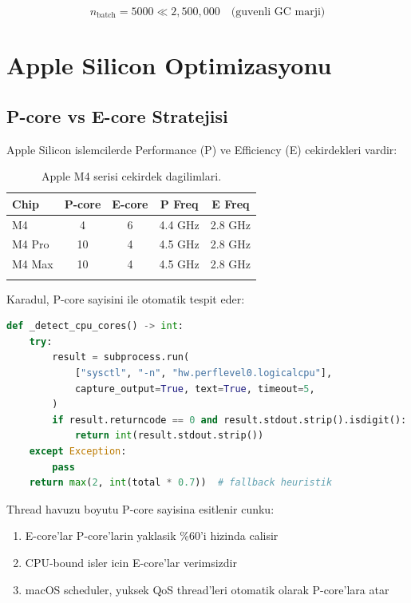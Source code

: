 \begin{equation}
  n_{\text{batch}} = 5000 \ll 2{,}500{,}000 \quad \text{(guvenli GC marji)}
\end{equation}


\section{Apple Silicon Optimizasyonu}
\label{sec:apple-silicon}

\subsection{P-core vs E-core Stratejisi}

Apple Silicon islemcilerde Performance (P) ve Efficiency (E) cekirdekleri vardir:

\begin{longtable}{lcccc}
\toprule
\textbf{Chip} & \textbf{P-core} & \textbf{E-core} & \textbf{P Freq} & \textbf{E Freq} \\
\midrule
\endhead
M4 & 4 & 6 & 4.4 GHz & 2.8 GHz \\
M4 Pro & 10 & 4 & 4.5 GHz & 2.8 GHz \\
M4 Max & 10 & 4 & 4.5 GHz & 2.8 GHz \\
\bottomrule
\caption{Apple M4 serisi cekirdek dagilimlari.}
\label{tab:apple-silicon-cores}
\end{longtable}

Karadul, P-core sayisini  ile otomatik tespit eder:

\begin{lstlisting}[language=Python, caption={P-core tespiti (config.py)}]
def _detect_cpu_cores() -> int:
    try:
        result = subprocess.run(
            ["sysctl", "-n", "hw.perflevel0.logicalcpu"],
            capture_output=True, text=True, timeout=5,
        )
        if result.returncode == 0 and result.stdout.strip().isdigit():
            return int(result.stdout.strip())
    except Exception:
        pass
    return max(2, int(total * 0.7))  # fallback heuristik
\end{lstlisting}

Thread havuzu boyutu P-core sayisina esitlenir cunku:
\begin{enumerate}
  \item E-core'lar P-core'larin yaklasik \%60'i hizinda calisir
  \item CPU-bound isler icin E-core'lar verimsizdir
  \item macOS scheduler, yuksek QoS thread'leri otomatik olarak P-core'lara atar
\end{enumerate}

